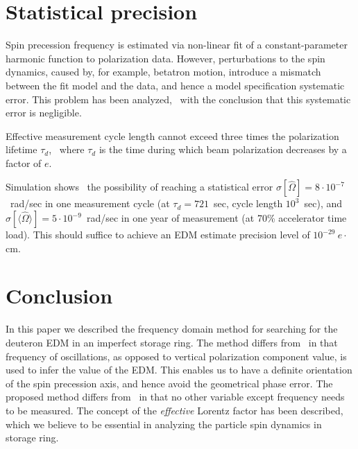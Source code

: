 \documentclass[a4paper]{jpconf}
\newcommand{\avg}[1]{\langle{#1}\rangle}
\newcommand{\W}{\Omega}
\begin{document}
\section{Statistical precision}
Spin precession frequency is estimated via non-linear fit of a constant-parameter harmonic function to polarization data. However, perturbations to the spin dynamics, caused by, for example, betatron motion, introduce a mismatch between the fit model and the data, and hence a model specification systematic error. This problem has been analyzed,~\cite{Aksentev:IPAC19:SMP} with the conclusion that this systematic error is negligible.

Effective measurement cycle length cannot exceed three times the polarization lifetime $\tau_d$,~\cite{Stats} where $\tau_d$ is the time during which beam polarization decreases by a factor of $e$.

Simulation shows~\cite{Stats} the possibility of reaching a statistical error $\sigma[\hat\W]=8\cdot10^{-7}$~rad/sec in one measurement cycle (at $\tau_d = 721$~sec, cycle length $10^3$~sec), and $\sigma[\avg{\hat\W}]=5\cdot10^{-9}$~rad/sec in one year of measurement (at 70\% accelerator time load). This should suffice to achieve an EDM estimate precision level of $10^{-29}~e\cdot$cm.

\section{Conclusion}
In this paper we described the frequency domain method for searching for the deuteron EDM in an imperfect storage ring. The method differs from~\cite{Farley, AGS-proposal-deuteron} in that frequency of oscillations, as opposed to vertical polarization component value, is used to infer the value of the EDM. This enables us to have a definite orientation of the spin precession axis, and hence avoid the geometrical phase error. 
The proposed method differs from~\cite{Koop2015} in that no other variable except frequency needs to be measured. The concept of the \textit{effective} Lorentz factor has been described, which we believe to be essential in analyzing the particle spin dynamics in storage ring.
\end{document}
